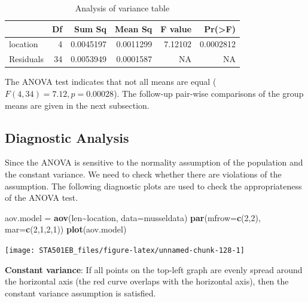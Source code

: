 \documentclass[
]{book}
\newenvironment{Shaded}{\begin{snugshade}}{\end{snugshade}}
\newcommand{\AttributeTok}[1]{\textcolor[rgb]{0.13,0.29,0.53}{#1}}
\newcommand{\DecValTok}[1]{\textcolor[rgb]{0.00,0.00,0.81}{#1}}
\newcommand{\FunctionTok}[1]{\textcolor[rgb]{0.13,0.29,0.53}{\textbf{#1}}}
\newcommand{\NormalTok}[1]{#1}
\newcommand{\OtherTok}[1]{\textcolor[rgb]{0.56,0.35,0.01}{#1}}
\newcommand{\SpecialCharTok}[1]{\textcolor[rgb]{0.81,0.36,0.00}{\textbf{#1}}}
\begin{document}
\begin{table}

\caption{\label{tab:unnamed-chunk-127}Analysis of variance table}
\centering
\begin{tabular}[t]{l|r|r|r|r|r}
\hline
  & Df & Sum Sq & Mean Sq & F value & Pr(>F)\\
\hline
location & 4 & 0.0045197 & 0.0011299 & 7.12102 & 0.0002812\\
\hline
Residuals & 34 & 0.0053949 & 0.0001587 & NA & NA\\
\hline
\end{tabular}
\end{table}

The ANOVA test indicates that not all means are equal (\(F(4,34) = 7.12, p = 0.00028\)). The follow-up pair-wise comparisons of the group means are given in the next subsection.

\hypertarget{diagnostic-analysis}{%
\subsection{Diagnostic Analysis}\label{diagnostic-analysis}}

Since the ANOVA is sensitive to the normality assumption of the population and the constant variance. We need to check whether there are violations of the assumption. The following diagnostic plots are used to check the appropriateness of the ANOVA test.

\begin{Shaded}
\begin{Highlighting}[]
\NormalTok{aov.model }\OtherTok{=} \FunctionTok{aov}\NormalTok{(len}\SpecialCharTok{\textasciitilde{}}\NormalTok{location, }\AttributeTok{data=}\NormalTok{musseldata)}
\FunctionTok{par}\NormalTok{(}\AttributeTok{mfrow=}\FunctionTok{c}\NormalTok{(}\DecValTok{2}\NormalTok{,}\DecValTok{2}\NormalTok{), }\AttributeTok{mar=}\FunctionTok{c}\NormalTok{(}\DecValTok{2}\NormalTok{,}\DecValTok{1}\NormalTok{,}\DecValTok{2}\NormalTok{,}\DecValTok{1}\NormalTok{))}
\FunctionTok{plot}\NormalTok{(aov.model)}
\end{Highlighting}
\end{Shaded}

\begin{center}\texttt{[image: STA501EB\_files/figure-latex/unnamed-chunk-128-1]} \end{center}

\textbf{Constant variance}: If all points on the top-left graph are evenly spread around the horizontal axis (the red curve overlaps with the horizontal axis), then the constant variance assumption is satisfied.
\end{document}

